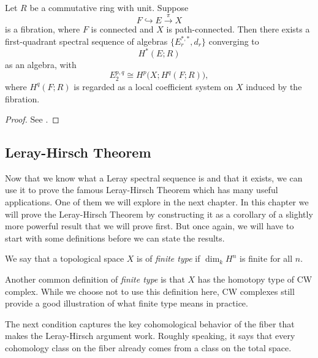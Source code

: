 \begin{theorem}
Let $R$ be a commutative ring with unit. Suppose
\begin{equation*}
    F\hookrightarrow E \overset{\pi}{\to} X
\end{equation*}
is a fibration, where $F$ is connected and $X$ is path-connected. Then there exists a first-quadrant spectral sequence of algebras $\{E_r^{*,*},d_r\}$ converging to
\begin{equation*}
    H^*(E;R)
\end{equation*}
as an algebra, with
\begin{equation*}
    E_2^{p,q}\cong H^p\bigl(X;H^q(F;R)\bigr),
\end{equation*}
where $H^q(F;R)$ is regarded as a local coefficient system on $X$ induced by the fibration.
\end{theorem}
\begin{proof}
    See \cite{mccleary}.
\end{proof}






\subsection{Leray-Hirsch  Theorem }
Now that we know what a Leray spectral sequence is and that it exists, we can use it to prove the famous Leray-Hirsch Theorem which has many useful applications. One of them we will explore in the next chapter. In this chapter we will prove the Leray-Hirsch Theorem by constructing it as a corollary of a slightly more powerful result that we will prove first. But once again, we will have to start with some definitions before we can state the results.
\begin{definition}
    We say that a topological space $X$ is of \textit{finite type} if $\dim_k H^n$ is finite for all $n$.
\end{definition}
\begin{example}
     Another common definition of \textit{finite type} is that $X$ has the homotopy type of  CW complex. While we choose not to use this definition here, CW complexes still provide a good illustration of what finite type means in practice.
\end{example}


The next condition captures the key cohomological behavior of the fiber that makes the Leray-Hirsch argument work. Roughly speaking, it says that every cohomology class on the fiber already comes from a class on the total space.


